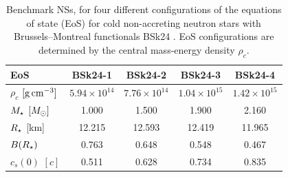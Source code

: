 \begin{table}[tb]
    \centering
    \begin{tabular}{l c c c c}
    \toprule
    \bf EoS & \bf BSk24-1 & \bf BSk24-2 & \bf BSk24-3 & \bf BSk24-4 \\ \midrule\midrule
    $\rho_c$ $[\rm{g \, cm^{-3}}]$ & $5.94 \times 10^{14}$   & $7.76 \times 10^{14}$ & $1.04 \times 10^{15}$ & $1.42 \times 10^{15}$  \\
    $M_\star$ $[M_\odot]$ & 1.000 & 1.500 & 1.900 & 2.160  \\
    $R_\star$ [km] & 12.215  & 12.593 & 12.419 & 11.965 \\
    $B(R_\star)$ & 0.763 & 0.648 & 0.548 & 0.467\\
    $c_s(0)$ $[c]$ & 0.511 & 0.628 & 0.734 & 0.835 \\
    \bottomrule
    \end{tabular} 
    \caption{Benchmark NSs, for four different configurations of the equations of state (EoS) for cold non-accreting neutron stars with Brussels–Montreal functionals BSk24 \cite{Pearson:2018tkr_Unifiedequationsstate}. EoS configurations are determined by the central mass-energy density $\rho_c$.}
    \label{tab:BSk_configs}
\end{table} 

